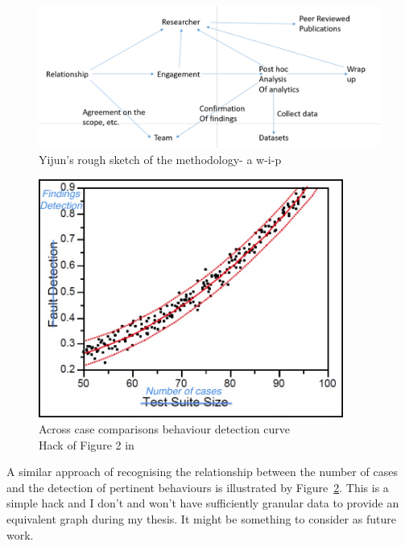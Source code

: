 \begin{figure}
    \centering
    \includegraphics[width=14cm]{images/rough-sketches/Yijun-rough-sketch-of-relationships-in-case-study-methodology.png}
    \caption{Yijun's rough sketch of the methodology- a w-i-p}
    \label{fig:yijun-methodology-sketch}
\end{figure}



\begin{figure}
    \centering
    \includegraphics[width=10cm]{images/rough-sketches/across-case-comparisons.jpg}
    \caption{Across case comparisons behaviour detection curve \\Hack of Figure 2 in \citep[p.2]{briand2007_a_critical_analysis_of_empirical_research_in_software_testing}}
    \label{fig:across-case-comparisons-behaviour-detection-curve}
\end{figure}
A similar approach of recognising the relationship between the number of cases and the detection of pertinent behaviours is illustrated by Figure~\ref{fig:across-case-comparisons-behaviour-detection-curve}. This is a simple hack and I don't and won't have sufficiently granular data to provide an equivalent graph during my thesis. It might be something to consider as future work.


